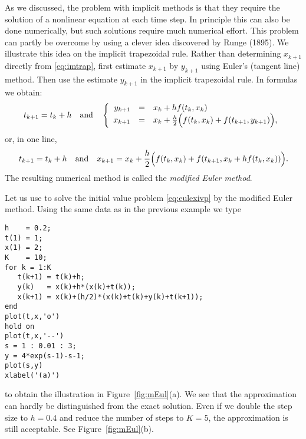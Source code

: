 \documentclass{ximera}
\begin{document}
As we discussed, the problem with implicit methods is that they require
the solution of a nonlinear equation at each time step.  In principle
this can also be done numerically, but such solutions 
require much numerical effort.  This problem can partly be overcome by 
using a clever idea discovered by {\sc Runge} (1895).  We illustrate 
this idea on the implicit trapezoidal rule.  Rather than determining 
$x_{k+1}$ directly from \eqref{eq:imtrap}, first estimate 
$x_{k+1}$ by $y_{k+1}$ using Euler's 
(tangent line) method.  Then use the estimate $y_{k+1}$ in the implicit 
trapezoidal rule.
In formulas we obtain:
\[
t_{k+1} = t_k+h \quad\mbox{and}\quad
\left\{\begin{array}{rcl}
y_{k+1} & = & x_k + h f(t_k, x_k)\\
x_{k+1} & = & x_k + \frac{h}{2}
\Big( f(t_k, x_k)+f(t_{k+1}, y_{k+1})\Big),
\end{array}\right.
\]
or, in one line,
\begin{equation}
\label{eq:meulmethod}
t_{k+1} = t_k+h \quad\mbox{and}\quad
x_{k+1} = x_k + \frac{h}{2}
\Big( f(t_k, x_k)+f(t_{k+1}, x_k + h f(t_k, x_k))\Big).
\end{equation}
The resulting numerical method is called the {\em modified Euler method}.
 

Let us use \Matlab to solve the initial value problem
\eqref{eq:eulexivp} by the modified Euler method.  
Using the same data as in the previous example we type
\begin{verbatim}
h    = 0.2;
t(1) = 1;
x(1) = 2;
K    = 10;
for k = 1:K
   t(k+1) = t(k)+h;
   y(k)   = x(k)+h*(x(k)+t(k));
   x(k+1) = x(k)+(h/2)*(x(k)+t(k)+y(k)+t(k+1));
end
plot(t,x,'o')
hold on
plot(t,x,'--')
s = 1 : 0.01 : 3;
y = 4*exp(s-1)-s-1;
plot(s,y)
xlabel('(a)')
\end{verbatim}
to obtain the illustration in Figure~\ref{fig:mEul}(a).
We see that the approximation can hardly be distinguished from
the exact solution.  Even if we double the step size 
to $h=0.4$ and reduce the number of steps to $K=5$, the 
approximation is still acceptable.  See Figure~\ref{fig:mEul}(b).

\begin{figure*}[htb]
   \centerline{%
   }
   \caption{Approximations of the solution of
   \protect\eqref{eq:eulexivp} by the modified Euler method
   with step sizes: (a) $h=0.2$; (b) $h=0.4$.
   The exact solution is shown with a solid line.}
   \label{fig:mEul}
\end{figure*}
\end{document}

